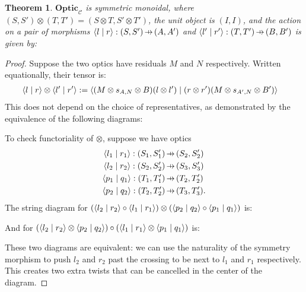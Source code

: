 \documentclass[11pt,letterpaper]{article}
\theoremstyle{plain}
\newtheorem{theorem}{Theorem}[subsection]
\theoremstyle{definition}
\newcommand{\C}{\mathscr{C}}
\newcommand{\Optic}{\mathbf{Optic}}
\newcommand{\rep}[2]{{\ensuremath \left\langle #1 \mid #2 \right\rangle}}
\newcommand{\hto}{\ensuremath{\,\mathaccent\shortmid\rightarrow\,}}
\begin{document}
\begin{theorem}
  $\Optic_\C$ is symmetric monoidal, where $(S, S') \otimes (T, T') = (S \otimes T, S' \otimes T')$, the unit object is $(I, I)$, and the action on a pair of morphisms $\rep{l}{r} : (S, S') \hto (A, A')$ and $\rep{l'}{r'} : (T, T') \hto (B, B')$ is given by:
  \begin{center}
    
  \end{center}
\end{theorem}
\begin{proof}
  Suppose the two optics have residuals $M$ and $N$ respectively. Written equationally, their tensor is:
  \begin{align*}
    \rep{l}{r} \otimes \rep{l'}{r'} &:= \rep{(M \otimes s_{A,N} \otimes B)(l \otimes l')}{(r \otimes r')(M \otimes s_{A',N} \otimes B')}
  \end{align*}
  This does not depend on the choice of representatives, as demonstrated by the equivalence of the following diagrams:
  \begin{center}
    
    
  \end{center}
  To check functoriality of $\otimes$, suppose we have optics
  \begin{align*}
    \rep{l_1}{r_1} : (S_1, S_1') &\hto (S_2, S_2') \\
    \rep{l_2}{r_2} : (S_2, S_2') &\hto (S_3, S_3') \\
    \rep{p_1}{q_1} : (T_1, T_1') &\hto (T_2, T_2') \\
    \rep{p_2}{q_2} : (T_2, T_2') &\hto (T_3, T_3').
  \end{align*}
  The string diagram for $(\rep{l_2}{r_2} \circ \rep{l_1}{r_1}) \otimes (\rep{p_2}{q_2} \circ \rep{p_1}{q_1})$ is:
  \begin{center}
    
  \end{center}
  And for $(\rep{l_2}{r_2} \otimes \rep{p_2}{q_2}) \circ (\rep{l_1}{r_1} \otimes \rep{p_1}{q_1})$ is:
  \begin{center}
    
  \end{center}
  These two diagrams are equivalent: we can use the naturality of the symmetry morphism to push $l_2$ and $r_2$ past the crossing to be next to $l_1$ and $r_1$ respectively. This creates two extra twists that can be cancelled in the center of the diagram.


\end{proof}
\end{document}
